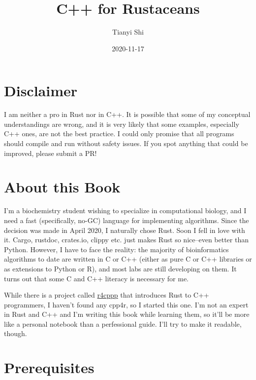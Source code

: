 \documentclass[
]{book}
\title{C++ for Rustaceans}
\author{Tianyi Shi}
\date{2020-11-17}
\begin{document}
\maketitle

{
\setcounter{tocdepth}{1}
\tableofcontents
}
\hypertarget{disclaimer}{%
\chapter*{Disclaimer}\label{disclaimer}}

I am neither a pro in Rust nor in C++. It is possible that some of my conceptual understandings are wrong, and it is very likely that some examples, especially C++ ones, are not the best practice. I could only promise that all programs should compile and run without safety issues. If you spot anything that could be improved, please submit a PR!

\hypertarget{about-this-book}{%
\chapter*{About this Book}\label{about-this-book}}

I'm a biochemistry student wishing to specialize in computational biology, and I need a fast (specifically, no-GC) language for implementing algorithms. Since the decision was made in April 2020, I naturally chose Rust. Soon I fell in love with it. Cargo, rustdoc, crates.io, clippy etc. just makes Rust so nice--even better than Python. However, I have to face the reality: the majority of bioinformatics algorithms to date are written in C or C++ (either as pure C or C++ libraries or as extensions to Python or R), and most labs are still developing on them. It turns out that some C and C++ literacy is necessary for me.

While there is a project called \href{https://github.com/nrc/r4cppp}{r4cppp} that introduces Rust to C++ programmers, I haven't found any cpp4r, so I started this one. I'm not an expert in Rust and C++ and I'm writing this book while learning them, so it'll be more like a personal notebook than a perfessional guide. I'll try to make it readable, though.

\hypertarget{prerequisites}{%
\chapter*{Prerequisites}\label{prerequisites}}
\end{document}
